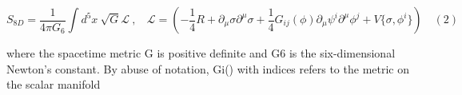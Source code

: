 \documentclass{article}
\begin{document}
\begin{equation}
S _ { 8 D } = \frac { 1 } { 4 \pi G _ { 6 } } \int d ^ { 5 } x ~ \sqrt { G } \mathcal { L } ~, ~ ~ ~ ~ \mathcal { L } = \left ( - \frac { 1 } { 4 } R + \partial _ { \mu } \sigma \partial ^ { \mu } \sigma + \frac { 1 } { 4 } G _ { i j } ( \phi ) \partial _ { \mu } \psi ^ { i } \partial ^ { \mu } \phi ^ { j } + V \{ \sigma, \phi ^ { i } \} \right ) \quad ( 2 )
\end{equation}


where the spacetime metric G is positive definite and G6 is the six-dimensional Newton's
constant. By abuse of notation, Gi() with indices refers to the metric on the scalar manifold
\end{document}
